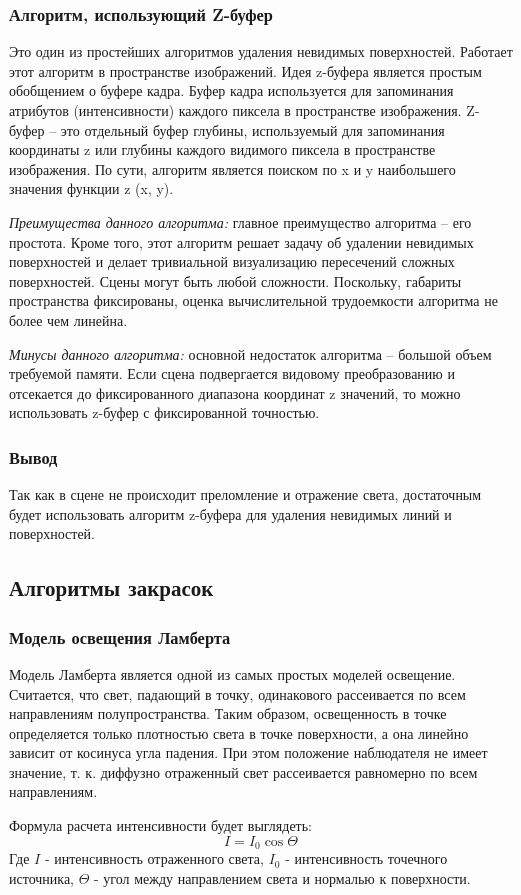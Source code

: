 \documentclass[14pt, a4paper]{extarticle}
\begin{document}
\subsubsection{Алгоритм, использующий Z-буфер}
Это один из простейших алгоритмов удаления невидимых поверхностей. Работает этот алгоритм в пространстве изображений. Идея z-буфера является простым обобщением о буфере кадра. Буфер кадра используется для запоминания атрибутов (интенсивности) каждого пиксела в пространстве изображения. Z-буфер – это отдельный буфер глубины, используемый для запоминания координаты z или глубины каждого видимого пиксела в пространстве изображения. По сути, алгоритм является поиском по x и y наибольшего значения функции z (x, y).\par
\textit{Преимущества данного алгоритма:} главное преимущество алгоритма – его простота. Кроме того, этот алгоритм решает задачу об удалении невидимых поверхностей и делает тривиальной визуализацию пересечений сложных поверхностей. Сцены могут быть любой сложности. Поскольку, габариты пространства фиксированы, оценка вычислительной трудоемкости алгоритма не более чем линейна.\par
\textit{Минусы данного алгоритма:} основной недостаток алгоритма – большой объем требуемой памяти. Если сцена подвергается видовому преобразованию и отсекается до фиксированного диапазона координат z значений, то можно использовать z-буфер с фиксированной точностью.
\subsubsection{Вывод}
Так как в сцене не происходит преломление и отражение света, достаточным будет использовать алгоритм z-буфера для удаления невидимых линий и поверхностей.

\subsection{Алгоритмы закрасок}
\subsubsection{Модель освещения Ламберта}
Модель Ламберта является одной из самых простых моделей освещение. Считается, что свет, падающий в точку, одинакового рассеивается по всем направлениям полупространства. Таким образом, освещенность в точке определяется только плотностью света в точке поверхности, а она линейно зависит от косинуса угла падения. При этом положение наблюдателя не имеет значение, т. к. диффузно отраженный свет рассеивается равномерно по всем направлениям.\par
Формула расчета интенсивности будет выглядеть:
\begin{equation}
	I = I_0\cos\Theta
\end{equation}
Где $I$ - интенсивность отраженного света, $I_0$ - интенсивность точечного источника, $\Theta$ - угол между направлением света и нормалью к поверхности.
\end{document}
